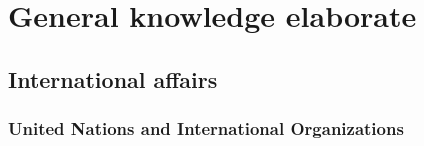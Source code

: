 \documentclass[
  openany]{book}
\begin{document}
\hypertarget{general-knowledge-elaborate}{%
\chapter{General knowledge elaborate}\label{general-knowledge-elaborate}}

\hypertarget{international-affairs}{%
\section{International affairs}\label{international-affairs}}

\hypertarget{united-nations-and-international-organizations}{%
\subsection{United Nations and International Organizations}\label{united-nations-and-international-organizations}}
\end{document}
